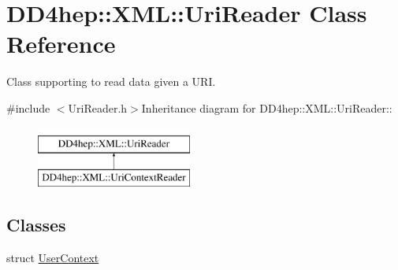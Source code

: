 \hypertarget{class_d_d4hep_1_1_x_m_l_1_1_uri_reader}{
\section{DD4hep::XML::UriReader Class Reference}
\label{class_d_d4hep_1_1_x_m_l_1_1_uri_reader}
}


Class supporting to read data given a URI.  


{\ttfamily \#include $<$UriReader.h$>$}Inheritance diagram for DD4hep::XML::UriReader::\begin{figure}[H]
\begin{center}
\leavevmode
\includegraphics[height=2cm]{class_d_d4hep_1_1_x_m_l_1_1_uri_reader}
\end{center}
\end{figure}
\subsection*{Classes}
\begin{DoxyCompactItemize}
\item 
struct \hyperlink{struct_d_d4hep_1_1_x_m_l_1_1_uri_reader_1_1_user_context}{UserContext}
\end{DoxyCompactItemize}
